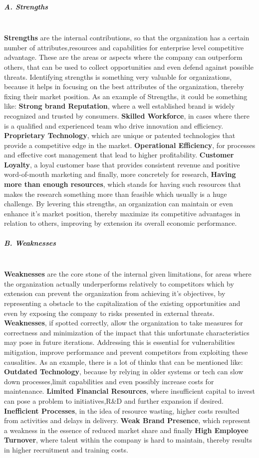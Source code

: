 \subparagraph{A. Strengths}\mbox{}\\
\textbf{Strengths} are the internal contributions, so that the organization has a certain number of attributes,resources and capabilities for enterprise level competitive advantage. These are the areas or aspects where the company can outperform others, that can be used to collect opportunities and even defend against possible threats. Identifying strengths is something very valuable for organizations, because it helps in focusing on the best attributes of the organization, thereby fixing their market position.
As an example of Strengths, it could be something like: \textbf{Strong brand Reputation}, where a well established brand is widely recognized and trusted by consumers. \textbf{Skilled Workforce}, in cases where there is a qualified and experienced team who drive innovation and efficiency. \textbf{Proprietary Technology}, which are unique or patented technologies that provide a competitive edge in the market. \textbf{Operational Efficiency}, for processes and effective cost management that lead to higher profitability. \textbf{Customer Loyalty}, a loyal customer base that provides consistent revenue and positive word-of-mouth marketing and finally, more concretely for research, \textbf{Having more than enough resources}, which stands for having such resources that makes the research something more than feasible which usually is a huge challenge.
By levering this strengths, an organization can maintain or even enhance it's market position, thereby maximize its competitive advantages in relation to others, improving by extension its overall economic performance.

\subparagraph{B. Weaknesses}\mbox{}\\
\textbf{Weaknesses} are the core stone of the internal given limitations, for areas where the organization actually underperforms relatively to competitors which by extension can prevent the organization from achieving it's objectives, by representing a obstacle to the capitalization of the existing opportunities and even  by exposing the company to risks presented in external threats. \textbf{Weaknesses}, if spotted correctly, allow the organization to take measures for correctness and minimization of the impact that this unfortunate characteristics may pose in future iterations. Addressing this is essential for vulnerabilities mitigation, improve performance and prevent competitors from exploiting these causalities.
As an example, there is a lot of thinks that can be mentioned like: \textbf{Outdated Technology}, because by relying in older systems or tech can slow down processes,limit capabilities and even possibly increase costs for maintenance. \textbf{Limited Financial Resources}, where insufficient capital to invest can pose a problem to initiatives,R\&D and further expansion if desired. \textbf{Inefficient Processes}, in the idea of resource wasting, higher costs resulted from activities and delays in delivery. \textbf{Weak Brand Presence}, which represent a weakness in the essence of reduced market share and finally \textbf{High Employee Turnover}, where talent within the company is hard to maintain, thereby results in higher recruitment and training costs.

